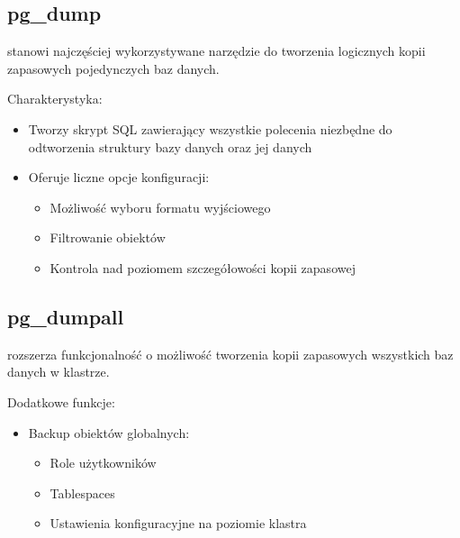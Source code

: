 \documentclass[a4paper,11pt,polish]{sphinxmanual}
\begin{document}
\subsection{pg\_dump}
\label{\detokenize{Kopie_zapasowe_i_odzyskiwanie_danych/kopie_zapasowe_i_odzyskiwanie_danych:pg-dump}}
\sphinxAtStartPar
{} stanowi najczęściej wykorzystywane narzędzie do tworzenia logicznych kopii zapasowych pojedynczych baz danych.

\sphinxAtStartPar
Charakterystyka:
\begin{itemize}
\item {} 
\sphinxAtStartPar
Tworzy skrypt SQL zawierający wszystkie polecenia niezbędne do odtworzenia struktury bazy danych oraz jej danych

\item {} 
\sphinxAtStartPar
Oferuje liczne opcje konfiguracji:
\begin{itemize}
\item {} 
\sphinxAtStartPar
Możliwość wyboru formatu wyjściowego

\item {} 
\sphinxAtStartPar
Filtrowanie obiektów

\item {} 
\sphinxAtStartPar
Kontrola nad poziomem szczegółowości kopii zapasowej

\end{itemize}

\end{itemize}


\subsection{pg\_dumpall}
\label{\detokenize{Kopie_zapasowe_i_odzyskiwanie_danych/kopie_zapasowe_i_odzyskiwanie_danych:pg-dumpall}}
\sphinxAtStartPar
{} rozszerza funkcjonalność  o możliwość tworzenia kopii zapasowych wszystkich baz danych w klastrze.

\sphinxAtStartPar
Dodatkowe funkcje:
\begin{itemize}
\item {} 
\sphinxAtStartPar
Backup obiektów globalnych:
\begin{itemize}
\item {} 
\sphinxAtStartPar
Role użytkowników

\item {} 
\sphinxAtStartPar
Tablespaces

\item {} 
\sphinxAtStartPar
Ustawienia konfiguracyjne na poziomie klastra

\end{itemize}

\end{itemize}
\end{document}
